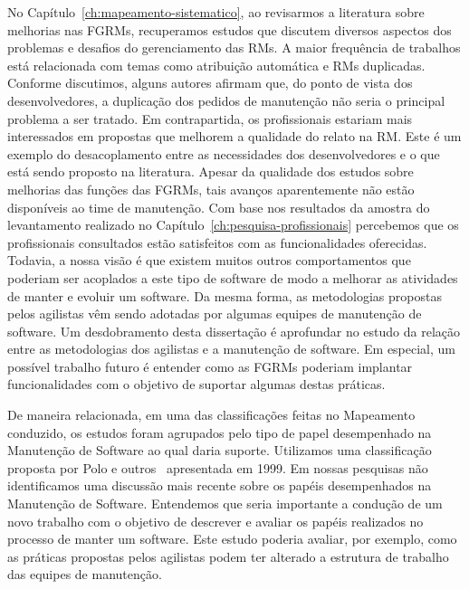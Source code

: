 No Capítulo~\ref{ch:mapeamento-sistematico}, ao revisarmos a literatura sobre
melhorias nas FGRMs, recuperamos estudos que discutem diversos aspectos dos
problemas e desafios do gerenciamento das RMs. A maior frequência de trabalhos
está relacionada com temas como atribuição automática e RMs duplicadas.
Conforme discutimos, alguns autores afirmam que, do ponto de vista dos
desenvolvedores, a duplicação dos pedidos de manutenção não seria o principal
problema a ser tratado. Em contrapartida, os profissionais estariam mais
interessados em propostas que melhorem a qualidade do relato na RM\@. Este é um
exemplo do desacoplamento entre as necessidades dos desenvolvedores e o que
está sendo proposto na literatura. Apesar da qualidade dos estudos sobre
melhorias das funções das FGRMs, tais avanços aparentemente não estão
disponíveis ao time de manutenção. Com base nos resultados da amostra do
levantamento realizado no Capítulo~\ref{ch:pesquisa-profissionais} percebemos
que os profissionais consultados estão satisfeitos com as funcionalidades
oferecidas. Todavia, a nossa visão é que existem muitos outros comportamentos
que poderiam ser acoplados a este tipo de software de modo a melhorar as
atividades de manter e evoluir um software. Da mesma forma, as metodologias
propostas pelos agilistas vêm sendo adotadas por algumas equipes de manutenção
de software. Um desdobramento desta dissertação é aprofundar no estudo da
relação entre as metodologias dos agilistas e a manutenção de software. Em
especial, um possível trabalho futuro é entender como as FGRMs poderiam
implantar funcionalidades com o objetivo de suportar algumas destas práticas.

De maneira relacionada, em uma das classificações feitas no Mapeamento
conduzido, os estudos foram agrupados pelo tipo de papel desempenhado na
Manutenção de Software ao qual daria suporte. Utilizamos uma classificação
proposta por Polo e outros~\cite{Polo1999} apresentada em 1999. Em nossas
pesquisas não identificamos uma discussão mais recente sobre os papéis
desempenhados na Manutenção de Software. Entendemos que seria importante a
condução de um novo trabalho com o objetivo de descrever e avaliar os papéis
realizados no processo de manter um software. Este estudo poderia avaliar, por
exemplo, como as práticas propostas pelos agilistas podem ter alterado a
estrutura de trabalho das equipes de manutenção.

